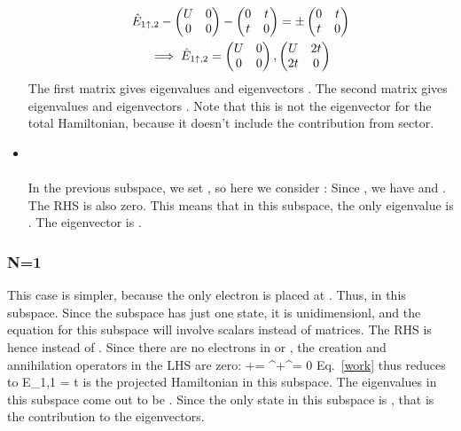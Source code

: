 \documentclass[12pt]{article}
\begin{document}
\begin{itemize}
\begin{gather}
\hat E_{1\uparrow,2} - \begin{pmatrix} U & 0 \\ 0 & 0 \end{pmatrix} - \begin{pmatrix}0 & t \\ t & 0 \end{pmatrix} = \pm \begin{pmatrix} 0 & t \\ t & 0 \end{pmatrix}\\
\implies \hat E_{1\uparrow,2} = \begin{pmatrix} U & 0  \\ 0 & 0 \end{pmatrix} , \begin{pmatrix} U & 2t \\ 2t & 0 \end{pmatrix}
\end{gather}
The first matrix gives eigenvalues  and eigenvectors . The second matrix gives eigenvalues  and eigenvectors . Note that this is not the eigenvector for the total Hamiltonian, because it doesn't include the contribution from  sector.
\item {} \\\\
In the previous subspace, we set , so here we consider :
Since , we have  and . The RHS is also zero. This means that in this subspace, the only eigenvalue is . The eigenvector is \il{\ket{\ua,\ua}}.
\end{itemize}

\subsubsection{N=1}
This case is simpler, because the only electron is placed at \il{\na}. Thus,  in this subspace. Since the subspace has just one state, it is unidimensionl, and the equation for this subspace will involve scalars instead of matrices. The RHS is hence  instead of . Since there are no electrons in \il{\nb} or \il{\nd}, the creation and annihilation operators in the LHS are zero:
\beq
\na\nb+\nc\nd = \cb^\dagger\ce+\ce^\dagger\cb = 0
\eeq
Eq.~\ref{work} thus reduces to
\beq[En1]
\hat E_{1\ua,1} = \pm t
\eeq
{} is the projected Hamiltonian in this subspace. The eigenvalues in this subspace come out to be . Since the only state in this subspace is , that is the contribution to the eigenvectors.
\end{document}
